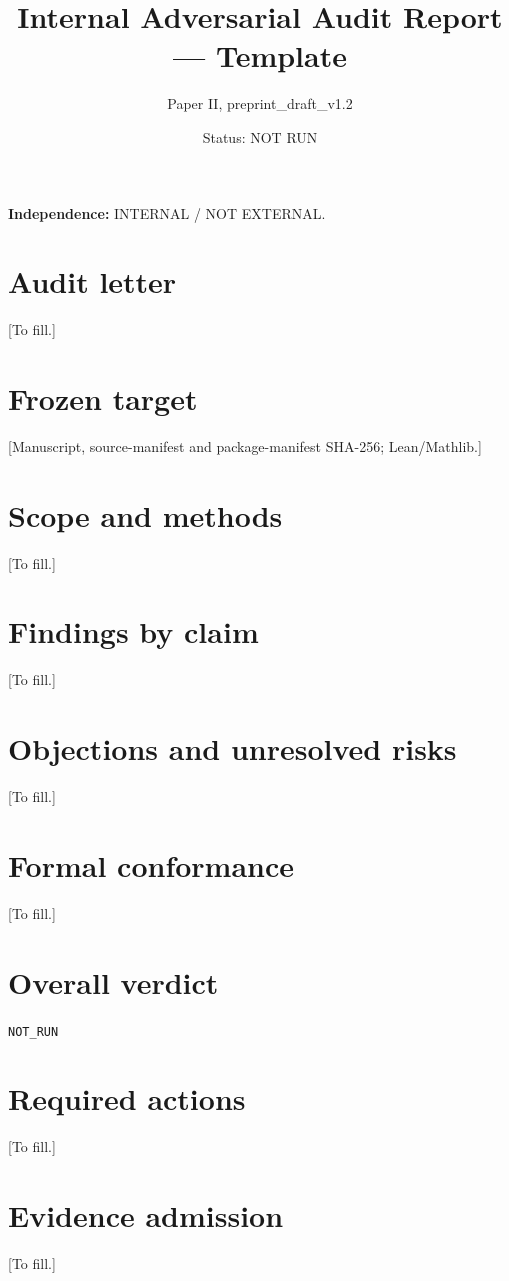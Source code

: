 \documentclass[11pt]{article}
\title{Internal Adversarial Audit Report --- Template}
\author{Paper II, preprint\_draft\_v1.2}
\date{Status: NOT RUN}
\begin{document}
\maketitle
\noindent\textbf{Independence:} INTERNAL / NOT EXTERNAL.

\section{Audit letter}
[To fill.]
\section{Frozen target}
[Manuscript, source-manifest and package-manifest SHA-256; Lean/Mathlib.]
\section{Scope and methods}
[To fill.]
\section{Findings by claim}
[To fill.]
\section{Objections and unresolved risks}
[To fill.]
\section{Formal conformance}
[To fill.]
\section{Overall verdict}
\texttt{NOT\_RUN}
\section{Required actions}
[To fill.]
\section{Evidence admission}
[To fill.]
\end{document}
